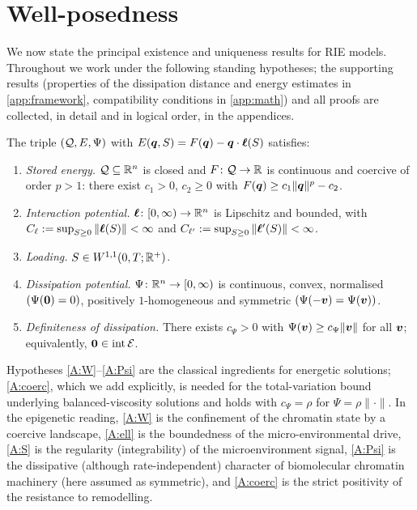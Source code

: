 \section{Well-posedness}\label{sec:math}

We now state the principal existence and uniqueness results for RIE
models. Throughout we work under the following standing hypotheses; the
supporting results (properties of the dissipation distance and energy
estimates in \cref{app:framework}, compatibility conditions in
\cref{app:math}) and all proofs are collected, in detail and in logical
order, in the appendices.

\begin{assumption}\label{ass:standing}
The triple $(\mathcal{Q},E,\Psi)$ with $E(\bm{q},S)=F(\bm{q})-\bm{q}\cdot\bm{\ell}(S)$
satisfies:
\begin{enumerate}[label=\textnormal{(A\arabic*)},leftmargin=2.6em,itemsep=2pt]
  \item\label{A:W} \emph{Stored energy.} $\mathcal{Q}\subseteq\mathbb{R}^n$ is closed and
  $F\colon\mathcal{Q}\to\mathbb{R}$ is continuous and coercive of order $p>1$: there
  exist $c_1>0$, $c_2\ge0$ with $F(\bm{q})\ge c_1\|\bm{q}\|^p-c_2$.
  \item\label{A:ell} \emph{Interaction potential.}
  $\bm{\ell}\colon[0,\infty)\to\mathbb{R}^n$ is Lipschitz and bounded, with
  $C_\ell:=\sup_{S\ge0}\|\bm{\ell}(S)\|<\infty$ and
  $C_{\ell'}:=\sup_{S\ge0}\|\bm{\ell}'(S)\|<\infty$.
  \item\label{A:S} \emph{Loading.} $S\in W^{1,1}(0,T;\mathbb{R}^+)$.
  \item\label{A:Psi} \emph{Dissipation potential.}
  $\Psi\colon\mathbb{R}^n\to[0,\infty)$ is continuous, convex, normalised
  $(\Psi(\bm{0})=0)$, positively $1$-homogeneous and symmetric
  $(\Psi(-\bm{v})=\Psi(\bm{v}))$.
  \item\label{A:coerc} \emph{Definiteness of dissipation.} There
  exists $c_\Psi>0$ with $\Psi(\bm{v})\ge c_\Psi\|\bm{v}\|$ for all
  $\bm{v}$; equivalently, $\bm{0}\in\operatorname{int}\mathcal{E}$.
\end{enumerate}
\end{assumption}

Hypotheses \ref{A:W}--\ref{A:Psi} are the classical ingredients for
energetic solutions; \ref{A:coerc}, which we add explicitly, is needed
for the total-variation bound underlying balanced-viscosity solutions
and holds with $c_\Psi=\rho$ for $\Psi=\rho\|\cdot\|$. In the
epigenetic reading, \ref{A:W} is the confinement of the chromatin state
by a coercive landscape, \ref{A:ell} is the boundedness of the
micro-environmental drive, \ref{A:S} is the regularity (integrability) of the microenvironment signal, \ref{A:Psi} is the dissipative (although rate-independent) character of biomolecular chromatin machinery (here assumed as symmetric), and \ref{A:coerc} is the strict positivity of
the resistance to remodelling.

